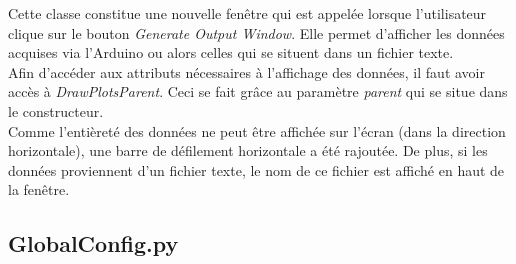 Cette classe constitue une nouvelle fenêtre qui est appelée lorsque l'utilisateur clique sur le bouton \textit{Generate Output Window}. Elle permet d'afficher les données acquises via l'Arduino ou alors celles qui se situent dans un fichier texte.\\

Afin d'accéder aux attributs nécessaires à l'affichage des données, il faut avoir accès à \textit{DrawPlotsParent}. Ceci se fait grâce au paramètre \textit{parent} qui se situe dans le constructeur.\\

Comme l'entièreté des données ne peut être affichée sur l'écran (dans la direction horizontale), une barre de défilement horizontale a été rajoutée. De plus, si les données proviennent d'un fichier texte, le nom de ce fichier est affiché en haut de la fenêtre.

\subsection{GlobalConfig.py}

